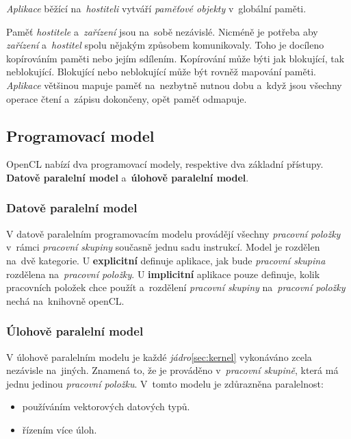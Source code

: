 \emph{Aplikace} běžící na~\emph{hostiteli} vytváří \emph{paměťové objekty} v~{globální paměti}.


Paměť \emph{hostitele} a~\emph{zařízení} jsou na~sobě nezávislé. Nicméně je potřeba aby \emph{zařízení}
a~\emph{hostitel} spolu nějakým způsobem komunikovaly.
Toho je docíleno kopírováním paměti nebo jejím sdílením. Kopírování může býti jak blokující,
tak neblokující. Blokující nebo neblokující může být
rovněž mapování paměti. \emph{Aplikace} většinou
mapuje paměť na~nezbytně nutnou dobu a~když jsou všechny operace čtení a~zápisu dokončeny, opět
paměť odmapuje.

\subsection{Programovací model}

OpenCL nabízí dva programovací modely, respektive dva základní přístupy. \textbf{Datově paralelní model} a~\textbf{úlohově paralelní model}.

\subsubsection{Datově paralelní model}

V datově paralelním programovacím modelu provádějí všechny \emph{pracovní položky} v~rámci \emph{pracovní skupiny} současně jednu sadu instrukcí. Model je rozdělen na~dvě kategorie.
U \textbf{explicitní} definuje aplikace, jak bude \emph{pracovní skupina} rozdělena na~\emph{pracovní položky}. U \textbf{implicitní} aplikace pouze definuje, kolik pracovních položek chce použít a~rozdělení \emph{pracovní skupiny} na~\emph{pracovní položky} nechá na~knihovně openCL.

\subsubsection{Úlohově paralelní model} 

V úlohově paralelním modelu je každé \emph{jádro}\ref{sec:kernel} vykonáváno zcela nezávisle na~jiných. Znamená to, že je prováděno v~\emph{pracovní skupině}, která má jednu jedinou \emph{pracovní položku}. V~tomto modelu je zdůrazněna paralelnost:

\begin{itemize}
\item používáním vektorových datových typů.
\item řízením více úloh.
\end{itemize}

